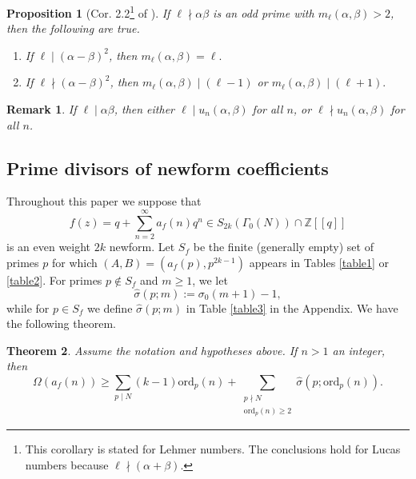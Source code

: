 \documentclass[12pt]{amsart}
\newtheorem*{remark}{Remark}
\newtheorem{thm}{Theorem}[section]
\newtheorem{prop}[thm]{Proposition}
\newcommand{\ord}{\mathrm{ord}}
\newcommand{\Z}{\mathbb{Z}}
\newcommand{\?}{\color{red}?}
\numberwithin{equation}{section}
\begin{document}
\begin{prop}[Cor. 2.2\footnote{This corollary is stated for Lehmer numbers. The conclusions hold for Lucas numbers because $\ell \nmid (\alpha+\beta)$.} of \cite{BHV}]\label{PropB} If $\ell\nmid \alpha \beta$ is an odd prime with
$m_{\ell}(\alpha,\beta)>2$, then the following are true.
\begin{enumerate}
\item If $\ell \mid (\alpha-\beta)^2$, then $m_{\ell}(\alpha,\beta)=\ell.$
\item If $\ell \nmid (\alpha-\beta)^2$, then $m_{\ell}(\alpha,\beta) \mid (\ell-1)$ or $m_{\ell}(\alpha,\beta)\mid (\ell+1).$
\end{enumerate}
\end{prop}

\begin{remark}
If $\ell \mid \alpha \beta$, then either $\ell \mid u_n(\alpha,\beta)$ for all $n$, 
or $\ell \nmid u_n(\alpha,\beta)$ for all $n$.
\end{remark}

\subsection{Prime divisors of newform coefficients}\label{SectionPrimeDivisors}

Throughout this paper we suppose that
\begin{equation}\label{qexpansion}
f(z)=q+\sum_{n=2}^{\infty}a_f(n)q^n\in S_{2k}(\Gamma_0(N)) \cap \Z[[q]]
\end{equation}
is an even weight $2k$ newform.
Let $S_f$ be the finite (generally empty) set of primes $p$ for which $(A,B)=(a_f(p),p^{2k-1})$ appears in Tables \ref{table1} or \ref{table2}. 
For primes $p\not \in S_f$ and $m\geq 1$, we let
\begin{equation}
\widehat{\sigma}(p;m):=\sigma_0(m+1)-1,
\end{equation}
while for $p\in S_f$ we define
$\widehat{\sigma}(p;m)$  in Table \ref{table3} in the Appendix.
We have the following theorem.

\begin{thm}\label{PrimeDivisorsGeneral} Assume the notation and hypotheses above.
If $n>1$ an integer, then
$$
\Omega(a_f(n))\geq \sum_{p\mid N} (k-1)\ord_p(n) +\sum_{\substack{p\nmid N \\ \ord_p(n)\geq 2}} \widehat{\sigma}(p;\ord_p(n)).
$$
\end{thm}
\end{document}
